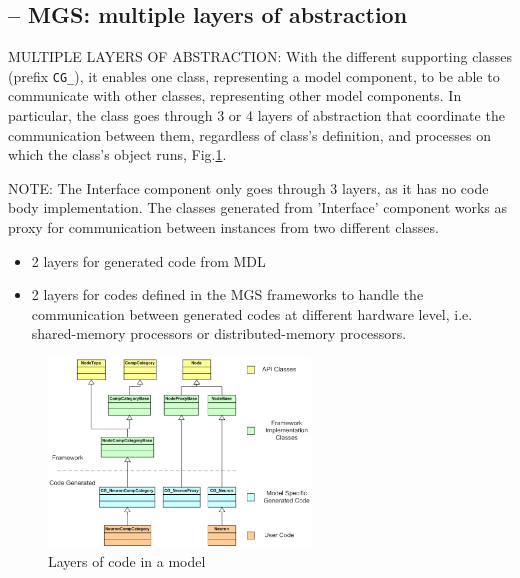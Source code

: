 \subsection{-- MGS: multiple layers of abstraction}
\label{sec:MGS-multiple-layer-of-abstraction}

MULTIPLE LAYERS OF ABSTRACTION: With the different supporting classes (prefix
\verb!CG_!), it enables one class, representing a model component, to be able to
communicate with other classes, representing other model components. In
particular, the class goes through 3 or 4 layers of abstraction that coordinate
the communication between them, regardless of class's definition, and processes
on which the class's object runs, Fig.\ref{fig:NTS_code-layers}.

NOTE: The Interface component only goes through 3 layers, as it has no code body
implementation. The classes generated from 'Interface' component works as proxy
for communication between instances from two different classes.

\begin{itemize}
  \item 2 layers for generated code from MDL 
  
  \item 2 layers for codes defined in the MGS frameworks to handle the
  communication between generated codes at different hardware level, i.e.
  shared-memory processors or distributed-memory processors.
\end{itemize}

\begin{figure}[hbt]
  \centerline{\includegraphics[height=5cm,
    angle=0]{./images/NTS_code-layers.eps}}
\caption{Layers of code in a model}
\label{fig:NTS_code-layers}
\end{figure}




